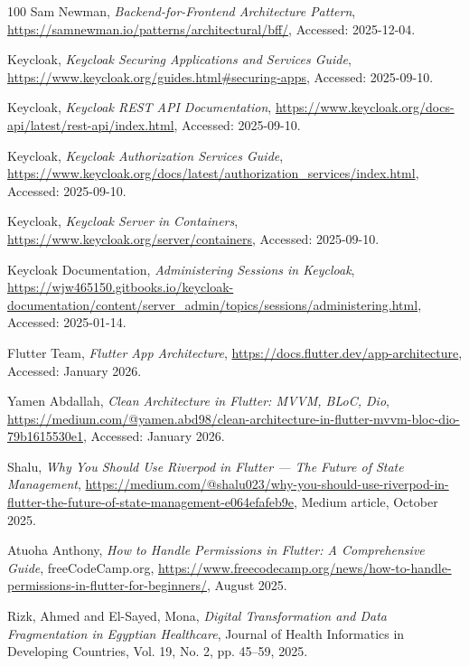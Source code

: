 \begin{thebibliography}{100}
  Sam Newman,
  \textit{Backend-for-Frontend Architecture Pattern},
  \url{https://samnewman.io/patterns/architectural/bff/}, Accessed: 2025-12-04.

  Keycloak,
  \textit{Keycloak Securing Applications and Services Guide},
  \url{https://www.keycloak.org/guides.html#securing-apps}, Accessed: 2025-09-10.

  Keycloak,
  \textit{Keycloak REST API Documentation},
  \url{https://www.keycloak.org/docs-api/latest/rest-api/index.html}, Accessed: 2025-09-10.

  Keycloak,
  \textit{Keycloak Authorization Services Guide},
  \url{https://www.keycloak.org/docs/latest/authorization_services/index.html}, Accessed: 2025-09-10.

  Keycloak,
  \textit{Keycloak Server in Containers},
  \url{https://www.keycloak.org/server/containers}, Accessed: 2025-09-10.

  Keycloak Documentation,
  \textit{Administering Sessions in Keycloak},
  \url{https://wjw465150.gitbooks.io/keycloak-documentation/content/server_admin/topics/sessions/administering.html}, Accessed: 2025-01-14.

  Flutter Team,
  \textit{Flutter App Architecture},
  \url{https://docs.flutter.dev/app-architecture}, Accessed: January 2026.

  Yamen Abdallah,
  \textit{Clean Architecture in Flutter: MVVM, BLoC, Dio},
  \url{https://medium.com/@yamen.abd98/clean-architecture-in-flutter-mvvm-bloc-dio-79b1615530e1}, Accessed: January 2026.

  Shalu,
  \textit{Why You Should Use Riverpod in Flutter --- The Future of State Management},
  \url{https://medium.com/@shalu023/why-you-should-use-riverpod-in-flutter-the-future-of-state-management-e064efafeb9e}, Medium article, October 2025.

  Atuoha Anthony,
  \textit{How to Handle Permissions in Flutter: A Comprehensive Guide},
  freeCodeCamp.org,
  \url{https://www.freecodecamp.org/news/how-to-handle-permissions-in-flutter-for-beginners/}, August 2025.

  Rizk, Ahmed and El-Sayed, Mona,
  \textit{Digital Transformation and Data Fragmentation in Egyptian Healthcare},
  Journal of Health Informatics in Developing Countries, Vol. 19, No. 2, pp. 45--59, 2025.


\end{thebibliography}

